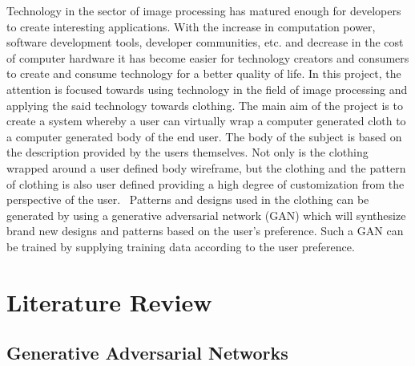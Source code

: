 \documentclass{article}
\begin{document}
Technology in the sector of image processing has matured enough for developers to create interesting applications. With the increase in computation power, software development tools, developer communities, etc. and decrease in the cost of computer hardware it has become easier for technology creators and consumers to create and consume technology for a better quality of life.
In this project, the attention is focused towards using technology in the field of image processing and applying the said technology towards clothing. The main aim of the project is to create a system whereby a user can virtually wrap a computer generated cloth to a computer generated body of the end user. The body of the subject is based on the description provided by the users themselves. Not only is the clothing wrapped around a user defined body wireframe, but the clothing and the pattern of clothing is also user defined providing a high degree of customization from the perspective of the user. 
Patterns and designs used in the clothing can be generated by using a generative adversarial network (GAN) which will synthesize brand new designs and patterns based on the user’s preference. Such a GAN can be trained by supplying training data according to the user preference.
\newpage
\section{Literature Review}
\subsection{Generative Adversarial Networks}
\end{document}
